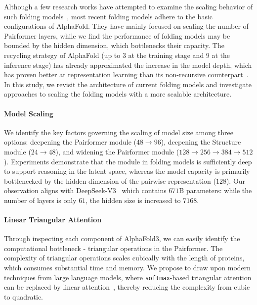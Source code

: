 Although a few research works have attempted to examine the scaling behavior of such folding models~\cite{qiao2024neuralplexer3,passaro2025boltz}, most recent folding models adhere to the basic configurations of AlphaFold. They have mainly focused on scaling the number of Pairformer layers, while we find the performance of folding models may be bounded by the hidden dimension, which bottlenecks their capacity. The recycling strategy of AlphaFold (up to $3$ at the training stage and $9$ at the inference stage) has already approximated the increase in the model depth, which has proven better at representation learning than its non-recursive counterpart~\cite{lan2019albert,yang2023looped}. In this study, we revisit the architecture of current folding models and investigate approaches to scaling the folding models with a more scalable architecture. 

\paragraph{Model Scaling} We identify the key factors governing the scaling of model size among three options: deepening the Pairformer module ($48 \to 96$), deepening the Structure module ($24 \to 48$), and widening the Pairformer module ($128 \to 256 \to 384 \to 512$). Experiments demonstrate that the module in folding models is sufficiently deep to support reasoning in the latent space, whereas the model capacity is primarily bottlenecked by the hidden dimension of the pairwise representation ($128$). Our observation aligns with DeepSeek-V3~\cite{liu2024deepseek} which contains $671$B parameters: while the number of layers is only $61$, the hidden size is increased to $7168$.
\paragraph{Linear Triangular Attention} Through inspecting each component of AlphaFold3, we can easily identify the computational bottleneck - triangular operations in the Pairformer. The complexity of triangular operations scales cubically with the length of proteins, which consumes substantial time and memory. We propose to draw upon modern techniques from large language models, where \texttt{softmax}-based triangular attention can be replaced by linear attention~\cite{sun2024liteformer,wu2025flashbias}, thereby reducing the complexity from cubic to quadratic. 

